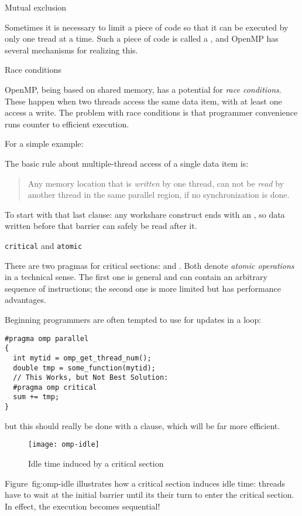  {Mutual exclusion}

Sometimes it is necessary to limit a piece of code
so that it can be executed by only one tread at a time.
Such a piece of code is called a , and
OpenMP has several mechanisms for realizing this.

 {Race conditions}

OpenMP, being based on shared memory, has a potential for
\emph{race conditions}.
These happen when two threads access the same data
item, with at least one access a write.
The problem with race conditions is that programmer convenience
runs counter to efficient execution.

For a simple example:

The basic rule about multiple-thread access of a single data item is:
\begin{quote}
  Any memory location that is \emph{written} by one thread, can not be
  \emph{read} by another thread in the same parallel region, if no
  synchronization is done.
\end{quote}

To start with that last clause: any workshare construct ends with an
, so data written before that barrier
can safely be read after it.

 {\texttt{critical} and \texttt{atomic}}
\label{sec:critical}

There are two pragmas for critical sections:  and .
Both denote \emph{atomic operations}
in a technical sense.
The first one is general and can contain an arbitrary sequence of instructions;
the second one is more limited but has performance advantages.

Beginning programmers are often tempted to use 
for updates in a loop:
\begin{lstlisting}[language=omp]
#pragma omp parallel
{
  int mytid = omp_get_thread_num();
  double tmp = some_function(mytid);
  // This Works, but Not Best Solution:
  #pragma omp critical
  sum += tmp;
}
\end{lstlisting}
but this should really be done with a  clause,
which will be far more efficient.

\begin{figure}[ht]
  \texttt{[image: omp-idle]}
  \caption{Idle time induced by a critical section}
  \label{fig:omp-idle}
\end{figure}
Figure~{fig:omp-idle} illustrates how a critical section induces idle time:
threads have to wait at the initial barrier
until its their turn to enter the critical section.
In effect, the execution becomes sequential!

